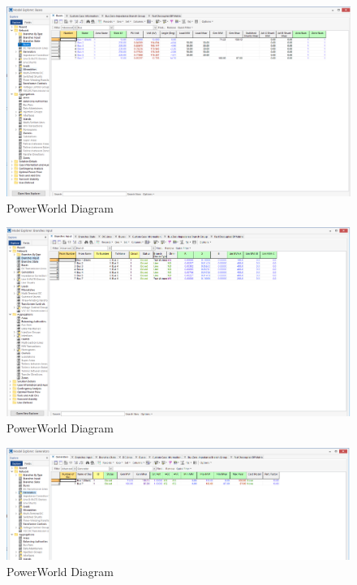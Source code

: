 \documentclass[12pt]{article}
\begin{document}
        \begin{figure}[H]
            \centerline{\includegraphics[scale=0.3]{images/PowerWorldTable1}}
            \caption{PowerWorld Diagram}
        \end{figure}
        \begin{figure}[H]
            \centerline{\includegraphics[scale=0.3]{images/PowerWorldTable2}}
            \caption{PowerWorld Diagram}
        \end{figure}
        \begin{figure}[H]
            \centerline{\includegraphics[scale=0.3]{images/PowerWorldTable3}}
            \caption{PowerWorld Diagram}
        \end{figure}
\end{document}
